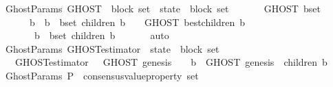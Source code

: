 \begin{isabellebody}
\isanewline
\isanewline
\isanewline
{}\isamarkupfalse%
\ {\isacharparenleft}\ GhostParams{\isacharparenright}\ GHOST\ {\isacharcolon}{\isacharcolon}\ {\isachardoublequoteopen}{\isacharparenleft}block\ set\ {\isacharasterisk}\ state{\isacharparenright}\ {\isacharequal}{\isachargreater}\ block\ set{\isachardoublequoteclose}\isanewline
\ \ \isanewline
\ \ \ \ {\isachardoublequoteopen}GHOST\ {\isacharparenleft}b{\isacharunderscore}set{\isacharcomma}\ {\isasymsigma}{\isacharparenright}\ {\isacharequal}\isanewline
\ \ \ \ \ \ {\isacharparenleft}{\isasymUnion}\ b\ {\isasymin}\ {\isacharbraceleft}b\ {\isasymin}\ b{\isacharunderscore}set{\isachardot}\ children\ {\isacharparenleft}b{\isacharcomma}\ {\isasymsigma}{\isacharparenright}\ {\isasymnoteq}\ {\isasymemptyset}{\isacharbraceright}{\isachardot}\ GHOST\ {\isacharparenleft}best{\isacharunderscore}children\ {\isacharparenleft}b{\isacharcomma}\ {\isasymsigma}{\isacharparenright}{\isacharcomma}\ {\isasymsigma}{\isacharparenright}{\isacharparenright}\isanewline
\ \ \ \ \ \ \ {\isasymunion}\ {\isacharbraceleft}b\ {\isasymin}\ b{\isacharunderscore}set{\isachardot}\ children\ {\isacharparenleft}b{\isacharcomma}\ {\isasymsigma}{\isacharparenright}\ {\isacharequal}\ {\isasymemptyset}{\isacharbraceright}{\isachardoublequoteclose}\isanewline
%
\isadelimproof
\ \ %
\endisadelimproof
%
\isatagproof
{}\isamarkupfalse%
\ auto%
\endisatagproof
{\isafoldproof}%
%
\isadelimproof
\isanewline
%
\endisadelimproof
\isanewline
\isanewline
{}\isamarkupfalse%
\ {\isacharparenleft}\ GhostParams{\isacharparenright}\ GHOST{\isacharunderscore}estimator\ {\isacharcolon}{\isacharcolon}\ {\isachardoublequoteopen}state\ {\isasymRightarrow}\ block\ set{\isachardoublequoteclose}\isanewline
\ \ \isanewline
\ \ \ \ {\isachardoublequoteopen}GHOST{\isacharunderscore}estimator\ {\isasymsigma}\ {\isacharequal}\ GHOST\ {\isacharparenleft}{\isacharbraceleft}genesis{\isacharbraceright}{\isacharcomma}\ {\isasymsigma}{\isacharparenright}\ {\isasymunion}\ {\isacharparenleft}{\isasymUnion}\ b\ {\isasymin}\ GHOST\ {\isacharparenleft}{\isacharbraceleft}genesis{\isacharbraceright}{\isacharcomma}\ {\isasymsigma}{\isacharparenright}{\isachardot}\ children\ {\isacharparenleft}b{\isacharcomma}\ {\isasymsigma}{\isacharparenright}{\isacharparenright}{\isachardoublequoteclose}\isanewline
\isanewline
\isanewline
{}\isamarkupfalse%
\ {\isacharparenleft}\ GhostParams{\isacharparenright}\ P\ {\isacharcolon}{\isacharcolon}\ {\isachardoublequoteopen}consensus{\isacharunderscore}value{\isacharunderscore}property\ set{\isachardoublequoteclose}\isanewline

\end{isabellebody}
